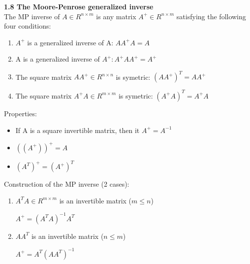 \documentclass{article}
\begin{document}
\begin{multicols}{3}
\textbf{1.8 The Moore-Penrose generalized inverse}\\
The MP inverse of $A \in R^{n \times m}$ is any matrix 
$A^+ \in R^{n \times m}$ satisfying the following four conditions:
\begin{enumerate}
    \item $A^+$ is a generalized inverse of A: $AA^+A = A$
    \item A is a generalized inverse of $A^+: A^+AA^+ = A^+$
    \item The square matrix $AA^+ \in R^{n \times n}$ is symetric: $(AA^+)^T = AA^+$
    \item The square matrix $A^+A \in R^{m \times m}$ is symetric: $(A^+A)^T = A^+A$
\end{enumerate}
Properties:
\begin{itemize}
    \item If A is a square invertible matrix, then it $A^+ = A^{-1}$
    \item $((A^+))^+ = A$
    \item $(A^T)^+ = (A^+)^T$
\end{itemize}
Construction of the MP inverse (2 cases):
\begin{enumerate}
    \item $A^TA \in R^{m \times m}$ is an invertible matrix ($m \leq n$)
        \begin{center}
            \begin{math}
                A^+ = (A^TA)^{-1}A^T
            \end{math}
        \end{center}
    \item $AA^T$ is an invertible matrix ($n \leq m$)
        \begin{center}
            \begin{math}
                A^+ = A^T(AA^T)^{-1} 
            \end{math}
        \end{center}
\end{enumerate}
\end{multicols}
\end{document}
